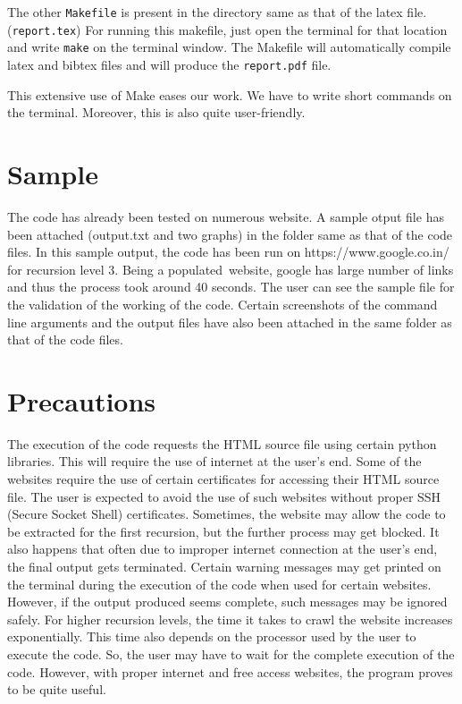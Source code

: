 \documentclass{report}
\begin{document}
The other \texttt{Makefile} is present in the directory same as that of the latex file. (\texttt{report.tex}) For running this makefile, just open the terminal for that location and write \texttt{make} on the terminal window. The Makefile will automatically compile latex and bibtex files and will produce the \texttt{report.pdf} file.

This extensive use of Make eases our work. We have to write short commands on the terminal. Moreover, this is also quite user-friendly.


\section{Sample}
The code has already been tested on numerous website. A sample otput file has been attached (output.txt and two graphs) in the folder same as that of the code files.
In this sample output, the code has been run on https://www.google.co.in/ for recursion level 3. Being a populated website, google has large number of links and thus the process took around 40 seconds. The user can see the sample file for the validation of the working of the code.
Certain screenshots of the command line arguments and the output files have also been attached in the same folder as that of the code files.

\section{Precautions}
The execution of the code requests the HTML source file using certain python libraries. This will require the use of internet at the user's end.
Some of the websites require the use of certain certificates for accessing their HTML source file.
The user is expected to avoid the use of such websites without proper SSH (Secure Socket Shell) certificates.
Sometimes, the website may allow the code to be extracted for the first recursion, but the further process may get blocked.
It also happens that often due to improper internet connection at the user's end, the final output gets terminated.
Certain warning messages may get printed on the terminal during the execution of the code when used for certain websites. However, if the output produced seems complete, such messages may be ignored safely.
For higher recursion levels, the time it takes to crawl the website increases exponentially. This time also depends on the processor used by the user to execute the code. So, the user may have to wait for the complete execution of the code.
However, with proper internet and free access websites, the program proves to be quite useful.
\end{document}
